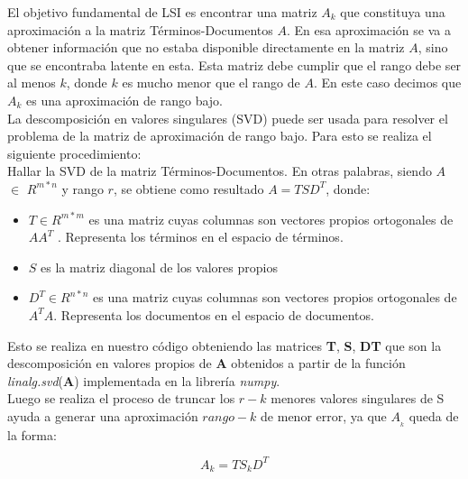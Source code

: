 \documentclass[spanish]{article}
\begin{document}
El objetivo fundamental de LSI es encontrar una matriz ${\displaystyle A_{k}}$ que constituya una aproximación a la matriz Términos-Documentos ${\displaystyle A}$. En esa aproximación se va a obtener información que no estaba disponible directamente en la matriz ${\displaystyle A}$, sino que se encontraba latente en esta. Esta matriz debe cumplir que el rango debe ser al menos ${\displaystyle k}$, donde ${\displaystyle k}$ es mucho menor que el rango de ${\displaystyle A}$. En este caso decimos que ${\displaystyle A_{k}}$ es una aproximación de rango bajo.\\

La descomposición en valores singulares (SVD) puede ser usada para resolver el problema de la matriz de aproximación de rango bajo. Para esto se realiza el siguiente procedimiento:\\

 Hallar la SVD de la matriz Términos-Documentos. En otras palabras, siendo ${\displaystyle A}$ $ \in $ ${\displaystyle R^{m*n}}$ y rango ${\displaystyle r}$, se obtiene como resultado ${\displaystyle A=TSD^{T}}$, donde:
\begin{itemize}

\item ${\displaystyle T} \in {\displaystyle R^{m*m}}$ es una matriz cuyas columnas son vectores propios ortogonales de $ {\displaystyle AA^{T}}$ . Representa los términos en el espacio de términos.

\item ${\displaystyle S}$ es la matriz diagonal de los valores propios

\item ${\displaystyle D^T} \in {\displaystyle R^{n*n}}$ es una matriz cuyas columnas son vectores propios ortogonales de ${\displaystyle A^{T}A}$. Representa los documentos en el espacio de documentos.
\end{itemize}

Esto se realiza en nuestro código obteniendo las matrices \textbf{T}, \textbf{S}, \textbf{DT} que son la descomposición en valores propios de \textbf{A} obtenidos a partir de la función \emph{linalg.svd}(\textbf{A})
implementada en la librería \emph{numpy}.\\

Luego se realiza el proceso de truncar los $r-k$ menores valores
 singulares de S ayuda a generar una aproximación $rango-k$ de menor error, ya que $A_{_{k}}$ queda de la forma:

$$A_{k}=TS_{k}D^{T}$$
\end{document}
